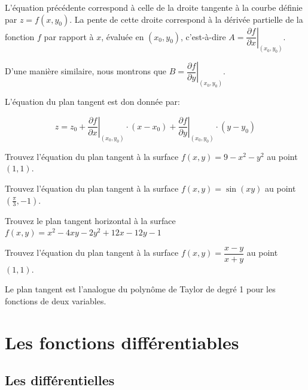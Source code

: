 \documentclass[]{book}
\theoremstyle{definition}
\theoremstyle{definition}
\theoremstyle{definition}
\theoremstyle{remark}
\let\BeginKnitrBlock\begin \let\EndKnitrBlock\end
\begin{document}
L'équation précédente correspond à celle de la droite tangente à la
courbe définie par \(z=f(x,y_0)\). La pente de cette droite correspond à
la dérivée partielle de la fonction \(f\) par rapport à \(x\), évaluée
en \((x_0,y_0)\), c'est-à-dire
\(A=\left.\dfrac{\partial f}{\partial x}\right|_{(x_0,y_0)}\).

D'une manière similaire, nous montrons que
\(B=\left.\dfrac{\partial f}{\partial y}\right|_{(x_0,y_0)}\).

L'équation du plan tangent est don donnée par:

\[ z = z_0 + \left.\dfrac{\partial f}{\partial x}\right|_{(x_0,y_0)}\cdot (x-x_0)+\left.\dfrac{\partial f}{\partial y}\right|_{(x_0,y_0)}\cdot (y-y_0) \]

\BeginKnitrBlock{example}
\protect\hypertarget{exm:unnamed-chunk-171}{}{\label{exm:unnamed-chunk-171}
}Trouvez l'équation du plan tangent à la surface \(f(x,y)=9-x^2-y^2\) au
point \((1,1)\).
\EndKnitrBlock{example}
\vspace*{8cm}

\BeginKnitrBlock{example}
\protect\hypertarget{exm:unnamed-chunk-172}{}{\label{exm:unnamed-chunk-172}
}Trouvez l'équation du plan tangent à la surface \(f(x,y)=\sin(xy)\) au
point \(\left(\frac{\pi}{3},-1 \right)\).
\EndKnitrBlock{example}
\vspace*{8cm}

\BeginKnitrBlock{example}
\protect\hypertarget{exm:unnamed-chunk-173}{}{\label{exm:unnamed-chunk-173}
}Trouvez le plan tangent horizontal à la surface
\(f(x,y)=x^2-4xy-2y^2+12x-12y-1\)
\EndKnitrBlock{example}
\vspace*{8cm}

\BeginKnitrBlock{example}
\protect\hypertarget{exm:unnamed-chunk-174}{}{\label{exm:unnamed-chunk-174}
}Trouvez l'équation du plan tangent à la surface
\(f(x,y)=\dfrac{x-y}{x+y}\) au point \((1,1)\).
\EndKnitrBlock{example}
\vspace*{8cm}

\BeginKnitrBlock{remark}
{}Le plan tangent est l'analogue du polynôme
de Taylor de degré 1 pour les fonctions de deux variables.
\EndKnitrBlock{remark}

\hypertarget{les-fonctions-differentiables}{%
\section{Les fonctions
différentiables}\label{les-fonctions-differentiables}}

\hypertarget{les-differentielles}{%
\subsection{Les différentielles}\label{les-differentielles}}
\end{document}
